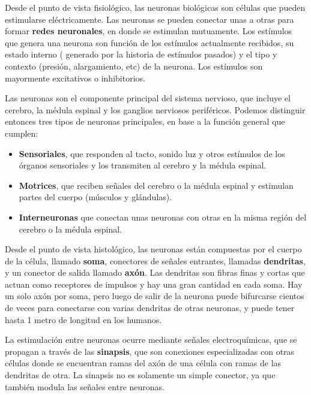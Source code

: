 Desde el punto de vista fisiológico, las neuronas biológicas son células que pueden estimularse eléctricamente. Las neuronas se pueden conectar unas a otras para formar \textbf{redes neuronales}, en donde se estimulan mutuamente. Los estímulos que genera una neurona son función de los estímulos actualmente recibidos, su estado interno ( generado por la historia de estímulos pasados) y el tipo y contexto (presión, alargamiento, etc) de la neurona. Los estímulos son mayormente excitativos o inhibitorios. 

Las neuronas son el componente principal del sistema nervioso, que incluye el cerebro, la médula espinal y los ganglios nerviosos periféricos. Podemos distinguir entonces tres tipos de neuronas principales, en base a la función general que cumplen:

\begin{itemize}
 \item \textbf{Sensoriales}, que responden al tacto, sonido luz y otros estímulos de los órganos sensoriales y los transmiten al cerebro y la médula espinal.
 \item \textbf{Motrices}, que reciben señales del cerebro o la médula espinal y estimulan partes del cuerpo (músculos y glándulas). 
 \item \textbf{Interneuronas} que conectan unas neuronas con otras en la misma región del cerebro o la médula espinal.
\end{itemize}



 
Desde el punto de vista histológico, las neuronas están compuestas por el cuerpo de la célula, llamado \textbf{soma}, conectores de señales entrantes, llamadas \textbf{dendritas}, y un conector de salida llamado \textbf{axón}. Las dendritas son fibras finas  y cortas que actuan como receptores de impulsos y hay una gran cantidad en cada soma. Hay un solo axón por soma, pero luego de salir de la neurona puede bifurcarse cientos de veces para conectarse con varias dendritas de otras neuronas, y puede tener hasta 1 metro de longitud en los humanos.


La estimulación entre neuronas ocurre mediante señales electroquímicas, que se propagan a través de las \textbf{sinapsis}, que son conexiones especializadas con otras células donde se encuentran ramas del axón de una célula con ramas de las dendritas de otra. La sinapsis no es solamente un simple conector, ya que también modula las señales entre neuronas.

